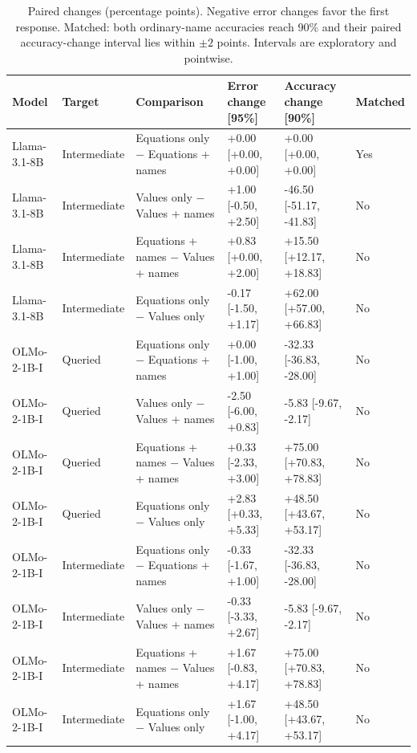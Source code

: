 \begin{table}[t]
\centering\small\setlength{\tabcolsep}{3pt}
\begin{tabular}{@{}p{}p{}p{}p{}p{}p{}@{}}
\toprule
Model & Target & Comparison & Error change [95\%] & Accuracy change [90\%] & Matched \\
\midrule
Llama-3.1-8B & Intermediate & Equations only $-$ Equations + names & +0.00 [+0.00, +0.00] & +0.00 [+0.00, +0.00] & Yes \\
Llama-3.1-8B & Intermediate & Values only $-$ Values + names & +1.00 [-0.50, +2.50] & -46.50 [-51.17, -41.83] & No \\
Llama-3.1-8B & Intermediate & Equations + names $-$ Values + names & +0.83 [+0.00, +2.00] & +15.50 [+12.17, +18.83] & No \\
Llama-3.1-8B & Intermediate & Equations only $-$ Values only & -0.17 [-1.50, +1.17] & +62.00 [+57.00, +66.83] & No \\
OLMo-2-1B-I & Queried & Equations only $-$ Equations + names & +0.00 [-1.00, +1.00] & -32.33 [-36.83, -28.00] & No \\
OLMo-2-1B-I & Queried & Values only $-$ Values + names & -2.50 [-6.00, +0.83] & -5.83 [-9.67, -2.17] & No \\
OLMo-2-1B-I & Queried & Equations + names $-$ Values + names & +0.33 [-2.33, +3.00] & +75.00 [+70.83, +78.83] & No \\
OLMo-2-1B-I & Queried & Equations only $-$ Values only & +2.83 [+0.33, +5.33] & +48.50 [+43.67, +53.17] & No \\
OLMo-2-1B-I & Intermediate & Equations only $-$ Equations + names & -0.33 [-1.67, +1.00] & -32.33 [-36.83, -28.00] & No \\
OLMo-2-1B-I & Intermediate & Values only $-$ Values + names & -0.33 [-3.33, +2.67] & -5.83 [-9.67, -2.17] & No \\
OLMo-2-1B-I & Intermediate & Equations + names $-$ Values + names & +1.67 [-0.83, +4.17] & +75.00 [+70.83, +78.83] & No \\
OLMo-2-1B-I & Intermediate & Equations only $-$ Values only & +1.67 [-1.00, +4.17] & +48.50 [+43.67, +53.17] & No \\
\bottomrule
\end{tabular}
\caption{Paired changes (percentage points). Negative error changes favor the first response. Matched: both ordinary-name accuracies reach 90\% and their paired accuracy-change interval lies within $\pm2$ points. Intervals are exploratory and pointwise.}
\label{tab:r7-formats-contrasts-2}
\end{table}
